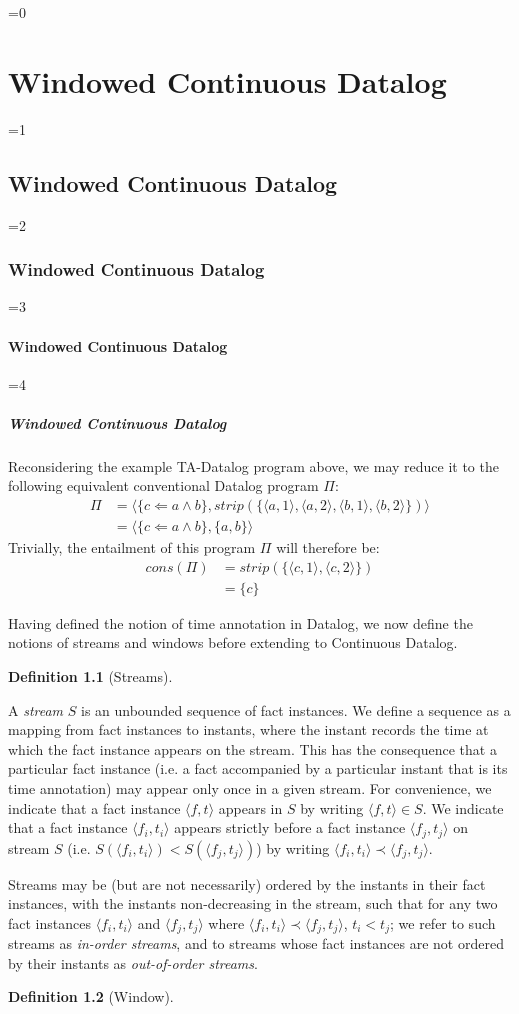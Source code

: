 \documentclass[twocolumn,preprint,3p,number]{elsarticle}
\theoremstyle{plain}
\theoremstyle{definition}
\newtheorem{definition}{Definition}
\newcounter{nestingdepth}
\newenvironment{nestedsection}[2]{
  \ifnum\value{nestingdepth}=0
    \chapter{#1}
  \else
    \ifnum\value{nestingdepth}=1
      \section{#1}
    \else
      \ifnum\value{nestingdepth}=2
        \subsection{#1}
      \else
        \ifnum\value{nestingdepth}=3
          \subsubsection{#1}
        \else
          \ifnum\value{nestingdepth}=4
            \paragraph{#1}
          \else
            \PackageError{nestedsections}{Maximum nesting level exceeded!}{uh oh!}
          \fi
        \fi
      \fi
    \fi
  \fi
  \addtocounter{nestingdepth}{1}
  \label{sec:#2}
}{\addtocounter{nestingdepth}{-1}}
\def\labeldef#1{\label{def:#1}}
\begin{document}
\begin{nestedsection}{Windowed Continuous Datalog}{semantics}
Reconsidering the example TA-Datalog program above, we may reduce it
to the following equivalent conventional Datalog program $\Pi$:
\begin{align*}
\Pi &= \langle \{ c \Leftarrow a \land b \}, strip(\{ \langle a, 1 \rangle, \langle a, 2 \rangle, \langle b, 1 \rangle, \langle b, 2 \rangle \}) \rangle \\
    &= \langle \{ c \Leftarrow a \land b \}, \{ a, b \} \rangle
\end{align*}
Trivially, the entailment of this program $\Pi$ will therefore be:
\begin{align*}
cons(\Pi) &= strip(\{\langle c, 1 \rangle, \langle c, 2 \rangle\}) \\
 &= \{ c \}  
\end{align*}

Having defined the notion of time annotation in Datalog, we now define
the notions of streams and windows before extending to Continuous Datalog.

\begin{definition}[Streams]
\labeldef{continuous datalog: stream}

A {\em stream} $S$ is an unbounded sequence of fact instances. We
define a sequence as a mapping from fact instances to instants, where
the instant records the time at which the fact instance appears on the
stream. This has the consequence that a particular fact instance
(i.e. a fact accompanied by a particular instant that is its time
annotation) may appear only once in a given stream. For convenience,
we indicate that a fact instance $\langle f, t\rangle$ appears in $S$
by writing $\langle f, t \rangle \in S$. We indicate that a fact
instance $\langle f_i, t_i \rangle$ appears strictly before a fact
instance $\langle f_j, t_j \rangle$ on stream $S$ (i.e.
$S\left(\langle f_i, t_i \rangle\right) < S\left(\langle f_j, t_j \rangle\right)$)
by writing $\langle f_i, t_i \rangle \prec \langle f_j, t_j \rangle$.

Streams may be (but are not necessarily) ordered by the instants in
their fact instances, with the instants non-decreasing in the stream,
such that for any two fact instances $\langle f_i, t_i \rangle$ and
$\langle f_j, t_j\rangle$ where $\langle f_i, t_i \rangle \prec
\langle f_j, t_j \rangle$, $t_i < t_j$; we refer to such
streams as {\em in-order streams}, and to streams whose fact instances
are not ordered by their instants as {\em out-of-order streams}.
\end{definition}

\begin{definition}[Window]
\labeldef{continuous datalog: window}


\end{definition}
\end{nestedsection}
\end{document}
